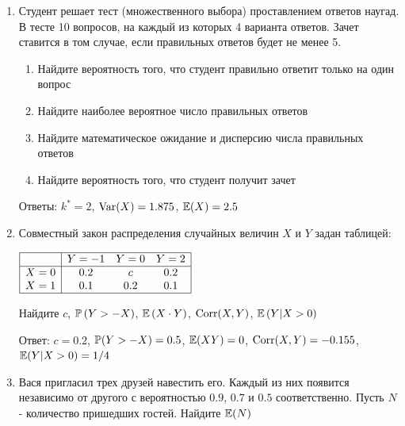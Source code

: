 \documentclass[12pt, a4paper]{article}\usepackage[]{graphicx}\usepackage[]{color}
\begin{document}
\begin{enumerate}

\item Студент решает тест (множественного выбора) проставлением
ответов наугад. В тесте 10 вопросов, на каждый из которых 4
варианта ответов. Зачет ставится в том случае, если правильных
ответов будет не менее 5.
\begin{enumerate}
\item Найдите вероятность того, что студент правильно ответит только
на один вопрос
\item Найдите наиболее вероятное число правильных ответов
\item Найдите математическое ожидание и дисперсию числа правильных
ответов
\item Найдите вероятность того, что студент получит зачет
\end{enumerate}

Ответы: $k^*=2$, $\Var(X)=1.875$, $\E(X)=2.5$

\item Совместный закон распределения случайных величин  $X$  и  $Y$
задан таблицей:

$\begin{array}{|c|ccc|}
\hline
{} & {Y=-1} & {Y=0} & {Y=2}\\
\hline
{X=0} & {0.2} & {c} & {0.2}\\
{X=1} & {0.1} & {0.2} & {0.1} \\
\hline
\end{array}$

Найдите  $c$,  $\P\left(Y>-X\right)$,  $\E\left(X\cdot Y \right)$, $\Corr(X,Y)$, $\E\left(Y|X>0\right)$

Ответ: $c=0.2$, $\P(Y>-X)=0.5$, $\E(XY)=0$, $\Corr(X,Y)=-0.155$, $\E(Y|X>0)=1/4$

\item Вася пригласил трех друзей навестить его. Каждый из них появится
независимо от другого с вероятностью $0.9$, $0.7$ и $0.5$
соответственно. Пусть $N$ - количество пришедших гостей. Найдите $\E(N)$


\end{enumerate}
\end{document}
